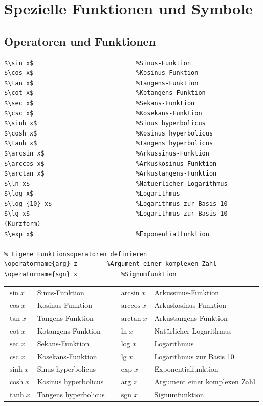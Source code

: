 \documentclass[12pt,a4paper]{article}
\begin{document}
\section{Spezielle Funktionen und Symbole}



\subsection{Operatoren und Funktionen}

\begin{lstlisting}[style=latex]
$\sin x$         					%Sinus-Funktion
$\cos x$         					%Kosinus-Funktion
$\tan x$         					%Tangens-Funktion
$\cot x$         					%Kotangens-Funktion
$\sec x$         					%Sekans-Funktion
$\csc x$         					%Kosekans-Funktion
$\sinh x$        					%Sinus hyperbolicus
$\cosh x$        					%Kosinus hyperbolicus
$\tanh x$        					%Tangens hyperbolicus
$\arcsin x$      					%Arkussinus-Funktion
$\arccos x$      					%Arkuskosinus-Funktion
$\arctan x$      					%Arkustangens-Funktion
$\ln x$          					%Natuerlicher Logarithmus
$\log x$         					%Logarithmus
$\log_{10} x$    					%Logarithmus zur Basis 10
$\lg x$          					%Logarithmus zur Basis 10 (Kurzform)
$\exp x$         					%Exponentialfunktion

% Eigene Funktionsoperatoren definieren
\operatorname{arg} z  		%Argument einer komplexen Zahl
\operatorname{sgn} x 	 		%Signumfunktion
\end{lstlisting}

\begin{ausgabe}
\begin{tabular}{l l c l l}
	$\sin x$ & Sinus-Funktion & & $\arcsin x$ & Arkussinus-Funktion\\
	$\cos x$ & Kosinus-Funktion & & $\arccos x$ & Arkuskosinus-Funktion\\
	$\tan x$ & Tangens-Funktion & & $\arctan x$ & Arkustangens-Funktion\\
	$\cot x$ & Kotangens-Funktion & & $\ln x$ & Natürlicher Logarithmus\\
	$\sec x$ & Sekans-Funktion & & $\log x$  & Logarithmus\\
	$\csc x$ & Kosekans-Funktion & & $\lg x$ & Logarithmus zur Basis 10\\
	$\sinh x$ & Sinus hyperbolicus & & $\exp x$ & Exponentialfunktion\\
	$\cosh x$ & Kosinus hyperbolicus & & $\operatorname{arg} z$ & Argument einer komplexen Zahl\\
	$\tanh x$ & Tangens hyperbolicus & & $\operatorname{sgn} x$ & Signumfunktion
\end{tabular}
\end{ausgabe}
\end{document}

